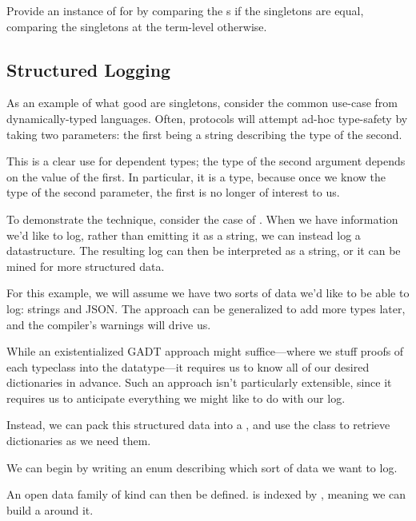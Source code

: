 \documentclass[book.tex]{subfiles}
\begin{document}
\begin{exercise}
Provide an instance of  for  by comparing the
s if the singletons are equal, comparing the singletons at the term-level
otherwise.
\end{exercise}
\begin{solution}
\end{solution}


\subsection{Structured Logging}

As an example of what good are singletons, consider the common use-case from
dynamically-typed languages. Often, protocols will attempt ad-hoc type-safety
by taking two parameters: the first being a string describing the type of the
second.

This is a clear use for dependent types; the type of the second argument depends
on the value of the first. In particular, it is a  type, because once
we know the type of the second parameter, the first is no longer of interest to
us.

To demonstrate the technique, consider the case of .
When we have information we'd like to log, rather than emitting it as a string,
we can instead log a datastructure. The resulting log can then be interpreted as
a string, or it can be mined for more structured data.

For this example, we will assume we have two sorts of data we'd like to be
able to log: strings and JSON. The approach can be generalized to add more types
later, and the compiler's warnings will drive us.

While an existentialized GADT approach might suffice---where we stuff proofs of
each typeclass into the datatype---it requires us to know all of our desired
dictionaries in advance. Such an approach isn't particularly extensible, since
it requires us to anticipate everything we might like to do with our log.

Instead, we can pack this structured data into a , and use the
 class to retrieve dictionaries as we need them.

We can begin by writing an enum describing which sort of data we want to log.


An open data family  of kind  can then be
defined.  is indexed by , meaning we can build a
 around it.
\end{document}
